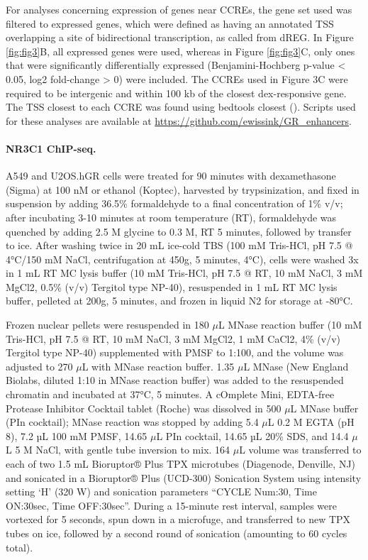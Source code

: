 \documentclass{article}
\begin{document}
{For analyses concerning expression of genes near CCREs, the gene set used was filtered to expressed genes, which were defined as having an annotated TSS overlapping a site of bidirectional transcription, as called from dREG. In Figure \ref{fig:fig3}B, all expressed genes were used, whereas in Figure \ref{fig:fig3}C, only ones that were significantly differentially expressed (Benjamini-Hochberg p-value < 0.05, log2 fold-change > 0) were included. The CCREs used in Figure 3C were required to be intergenic and within 100 kb of the closest dex-responsive gene. The TSS closest to each CCRE was found using bedtools closest (\cite{quinlan_bedtools:_2010}). 
Scripts used for these analyses are available at \url{https://github.com/ewissink/GR_enhancers}. 

\paragraph{NR3C1 ChIP-seq.} A549 and U2OS.hGR cells were treated for 90 minutes with dexamethasone (Sigma) at 100 nM or ethanol (Koptec), harvested by trypsinization, and fixed in suspension by adding 36.5\% formaldehyde to a final concentration of 1\% v/v; after incubating 3-10 minutes at room temperature (RT), formaldehyde was quenched by adding 2.5 M glycine to 0.3 M, RT 5 minutes, followed by transfer to ice. After washing twice in 20 mL ice-cold TBS (100 mM Tris-HCl, pH 7.5 @ 4°C/150 mM NaCl, centrifugation at 450g, 5 minutes, 4°C), cells were washed 3x in 1 mL RT MC lysis buffer (10 mM Tris-HCl, pH 7.5 @ RT, 10 mM NaCl, 3 mM MgCl2, 0.5\% (v/v) Tergitol type NP-40), resuspended in 1 mL RT MC lysis buffer, pelleted at 200g, 5 minutes, and frozen in liquid N2 for storage at -80°C.

Frozen nuclear pellets were resuspended in 180 $\mu$L MNase reaction buffer (10 mM Tris-HCl, pH 7.5 @ RT, 10 mM NaCl, 3 mM MgCl2, 1 mM CaCl2, 4\% (v/v) Tergitol type NP-40) supplemented with PMSF to 1:100, and the volume was adjusted to 270 $\mu$L with MNase reaction buffer. 1.35 $\mu$L MNase (New England Biolabs, diluted 1:10 in MNase reaction buffer) was added to the resuspended chromatin and incubated at 37°C, 5 minutes.  A cOmplete Mini, EDTA-free Protease Inhibitor Cocktail tablet (Roche) was dissolved in 500 $\mu$L MNase buffer (PIn cocktail); MNase reaction was stopped by adding 5.4 $\mu$L 0.2 M EGTA (pH 8), 7.2 µL 100 mM PMSF, 14.65 $\mu$L PIn cocktail, 14.65 µL 20\% SDS, and 14.4 $\mu$L 5 M NaCl, with gentle tube inversion to mix. 164 $\mu$L volume was transferred to each of two 1.5 mL Bioruptor® Plus TPX microtubes (Diagenode, Denville, NJ) and sonicated in a Bioruptor® Plus (UCD-300) Sonication System using intensity setting ‘H’ (320 W) and sonication parameters “CYCLE Num:30, Time ON:30sec, Time OFF:30sec”. During a 15-minute rest interval, samples were vortexed for 5 seconds, spun down in a microfuge, and transferred to new TPX tubes on ice, followed by a second round of sonication (amounting to 60 cycles total).

}
\end{document}
